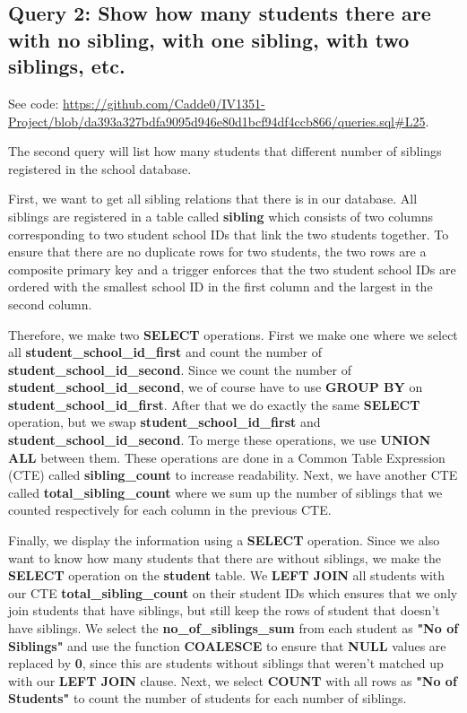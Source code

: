 \documentclass[a4paper]{scrartcl}
\begin{document}
\subsection{Query 2: Show how many students there are with no sibling, with one sibling, with two siblings, etc.}
See code: \url{https://github.com/Cadde0/IV1351-Project/blob/da393a327bdfa9095d946e80d1bcf94df4ccb866/queries.sql#L25}.

The second query will list how many students that different number of siblings registered in the school database.

First, we want to get all sibling relations that there is in our database. All siblings are registered in a table called \textbf{sibling} which consists of two columns corresponding to two student school IDs that link the two students together. To ensure that there are no duplicate rows for two students, the two rows are a composite primary key and a trigger enforces that the two student school IDs are ordered with the smallest school ID in the first column and the largest in the second column.

Therefore, we make two \textbf{SELECT} operations. First we make one where we select all \textbf{student\_school\_id\_first} and count the number of \textbf{student\_school\_id\_second}. Since we count the number of \textbf{student\_school\_id\_second}, we of course have to use \textbf{GROUP BY} on \textbf{student\_school\_id\_first}. After that we do exactly the same \textbf{SELECT} operation, but we swap \textbf{student\_school\_id\_first} and \textbf{student\_school\_id\_second}. To merge these operations, we use \textbf{UNION ALL} between them. These operations are done in a Common Table Expression (CTE) called \textbf{sibling\_count} to increase readability. Next, we have another CTE called \textbf{total\_sibling\_count} where we sum up the number of siblings that we counted respectively for each column in the previous CTE.

Finally, we display the information using a \textbf{SELECT} operation. Since we also want to know how many students that there are without siblings, we make the \textbf{SELECT} operation on the \textbf{student} table. We \textbf{LEFT JOIN} all students with our CTE \textbf{total\_sibling\_count} on their student IDs which ensures that we only join students that have siblings, but still keep the rows of student that doesn't have siblings. We select the \textbf{no\_of\_siblings\_sum} from each student as \textbf{"No of Siblings"} and use the function \textbf{COALESCE} to ensure that \textbf{NULL} values are replaced by \textbf{0}, since this are students without siblings that weren't matched up with our \textbf{LEFT JOIN} clause. Next, we select \textbf{COUNT} with all rows as \textbf{"No of Students"} to count the number of students for each number of siblings.
\end{document}

